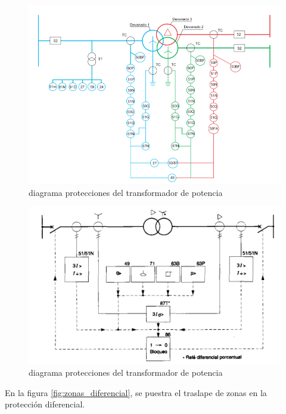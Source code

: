 \documentclass[a5paper]{book}%
\begin{document}
        \begin{figure}[H]
      \centering  
      \caption{diagrama protecciones del  transformador de potencia}
      \label{fig:diagramatrafo}
      \includegraphics[width=\linewidth]{diagramapttrafo}
    \end{figure}

           \begin{figure}[H]
      \centering  
      \caption{diagrama protecciones del  transformador de potencia}
      \label{fig:diagramatrafo1}
      \includegraphics[width=\linewidth]{proteccion_trafo_1}
    \end{figure}

En la figura \ref{fig:zonas_diferencial},  se puestra el traslape de
zonas en la protección diferencial.
    
\end{document}
